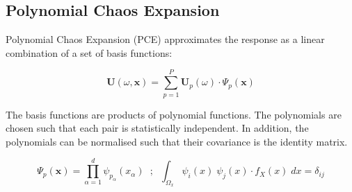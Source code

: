\subsection{Polynomial Chaos Expansion}

Polynomial Chaos Expansion (PCE) approximates the response as a linear combination of a set of basis functions: 

\begin{equation}
    \mathbf{U}(\omega,\mathbf{x}) =
    \sum_{p=1}^{P} \mathbf{U}_{p}(\omega)\cdot\Psi_{p}(\mathbf{x})
\label{PCE}
\end{equation}

The basis functions are products of polynomial functions. 
The polynomials are chosen such that each pair is statistically independent. 
In addition, the polynomials can be normalised such that their covariance is the identity matrix.

\begin{equation}
    \Psi_{p}(\mathbf{x}) = 
    \prod_{\alpha=1}^{d} \psi_{p_{\alpha}} \left(x_{\alpha}\right)
    \phantom{x}
    ;
    \phantom{x}
    \int_{\Omega_{x}} \psi_{i}(x)\phantom{.}\psi_{j}(x) \cdot f_{X}(x) \phantom{.} dx =
    \delta_{ij}
\label{PCE Basis}
\end{equation}
